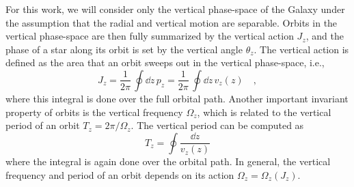 For this work, we will consider only the vertical phase-space of the Galaxy under the
assumption that the radial and vertical motion are separable.
Orbits in the vertical phase-space are then fully summarized by the vertical action
$J_z$, and the phase of a star along its orbit is set by the vertical angle $\theta_z$.
The vertical action is defined as the area that an orbit sweeps out in the vertical
phase-space, i.e.,
\begin{equation}
    J_z = \frac{1}{2\pi} \, \oint \dd z \, p_z =
        \frac{1}{2\pi} \, \oint \dd z \, v_z(z) \quad,
\end{equation}
where this integral is done over the full orbital path.
Another important invariant property of orbits is the vertical frequency $\Omega_z$,
which is related to the vertical period of an orbit $T_z = 2\pi / \Omega_z$.
The vertical period can be computed as
\begin{equation}
    T_z = \oint \frac{\dd z}{v_z(z)}
\end{equation}
where the integral is again done over the orbital path.
In general, the vertical frequency and period of an orbit depends on its action
$\Omega_z = \Omega_z(J_z)$.







